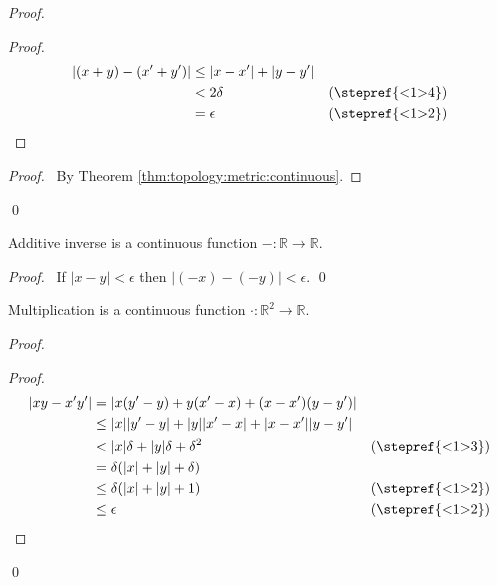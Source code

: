 \begin{proof}
  \pf
  \begin{proof}
    \pf
    \begin{align*}
      |(x + y) - (x' + y')| & \leq |x - x'| + |y - y'| \\
      & < 2 \delta & (\text{\stepref{<1>4}}) \\
      & = \epsilon & (\text{\stepref{<1>2}})
    \end{align*}
  \end{proof}
  \qedstep
  \begin{proof}
    \pf\ By Theorem \ref{thm:topology:metric:continuous}.
  \end{proof}
  \qed
\end{proof}

\begin{lm}
  Additive inverse is a continuous function $- : \mathbb{R} \rightarrow
  \mathbb{R}$.
\end{lm}

\begin{proof}
  \pf\ If $|x - y| < \epsilon$ then $|(-x)-(-y)| < \epsilon$. \qed
\end{proof}


\begin{lm}
  Multiplication is a continuous function $\cdot : \mathbb{R}^2 \rightarrow
  \mathbb{R}$.
\end{lm}

\begin{proof}
  \pf
  \begin{proof}
    \pf
    \begin{align*}
      |xy - x'y'| & = |x (y' - y) + y (x' - x) + (x - x') (y - y')| \\
      & \leq |x| |y'- y| + |y| |x' - x| + |x - x'| |y - y'| \\
      & < |x| \delta + |y| \delta + \delta^2 & (\text{\stepref{<1>3}}) \\
      & = \delta (|x| + |y| + \delta) \\
      & \leq \delta (|x| + |y| + 1) & (\text{\stepref{<1>2}}) \\
      & \leq \epsilon & (\text{\stepref{<1>2}})
    \end{align*}
  \end{proof}
  \qed
\end{proof}

